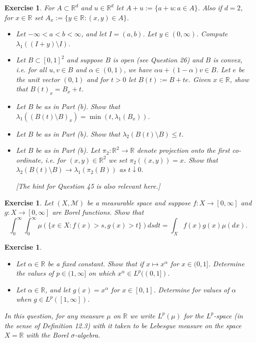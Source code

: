 \documentclass{article}
\newtheorem{exercise}[theorem]{Exercise}
\begin{document}
\begin{exercise}
For $A \subset \mathbb{R}^d$ and $u \in \mathbb{R}^d$ let $A + u := \{a + u : a \in A\}$. Also if $d = 2$, for $x \in \mathbb{R}$ set $A_x := \{y \in \mathbb{R} : (x, y) \in A\}$.
\begin{itemize}
    \item[(a)] Let $-\infty < a < b < \infty$, and let $I = (a,b)$. Let $y \in (0,\infty)$. Compute $\lambda_1((I + y) \setminus I)$.
    \item[(b)] Let $B \subset [0,1]^2$ and suppose $B$ is open (see Question 26) and $B$ is convex, i.e. for all $u,v \in B$ and $\alpha \in (0,1)$, we have $\alpha u + (1-\alpha)v \in B$. Let $e$ be the unit vector $(0,1)$ and for $t > 0$ let $B(t) := B + te$. Given $x \in \mathbb{R}$, show that $B(t)_x = B_x + t$.
    \item[(c)] Let $B$ be as in Part (b). Show that $\lambda_1((B(t) \setminus B)_x) = \min(t, \lambda_1(B_x))$.
    \item[(d)] Let $B$ be as in Part (b). Show that $\lambda_2(B(t) \setminus B) \leq t$.
    \item[(e)] Let $B$ be as in Part (b). Let $\pi_2 : \mathbb{R}^2 \to \mathbb{R}$ denote projection onto the first co-ordinate, i.e. for $(x,y) \in \mathbb{R}^2$ we set $\pi_2((x,y)) = x$. Show that $\lambda_2(B(t) \setminus B) \to \lambda_1(\pi_2(B))$ as $t \downarrow 0$.
    
    \textit{[The hint for Question 45 is also relevant here.]}
\end{itemize}
\end{exercise}

\begin{exercise}
Let $(X, \mathcal{M})$ be a measurable space and suppose $f : X \to [0,\infty]$ and $g : X \to [0,\infty]$ are Borel functions. Show that
\[
\int_{0}^{\infty} \int_{0}^{\infty} \mu(\{x \in X : f(x) > s, g(x) > t\})dsdt = \int_{X} f(x)g(x)\mu(dx).
\]
\end{exercise}


\begin{exercise}
\begin{itemize}
    \item[(a)] Let $\alpha \in \mathbb{R}$ be a fixed constant. Show that if $x \mapsto x^{\alpha}$ for $x \in (0,1]$. Determine the values of $p \in (1,\infty]$ on which $x^{\alpha} \in L^p((0,1])$.
    \item[(b)] Let $\alpha \in \mathbb{R}$, and let $g(x) = x^{\alpha}$ for $x \in [0,1]$. Determine for values of $\alpha$ when $g \in L^p([1,\infty])$.
\end{itemize}

\textit{In this question, for any measure $\mu$ on $\mathbb{R}$ we write $L^p(\mu)$ for the $L^p$-space (in the sense of Definition 12.3) with it taken to be Lebesgue measure on the space $X = \mathbb{R}$ with the Borel $\sigma$-algebra.}
\end{exercise}
\end{document}
